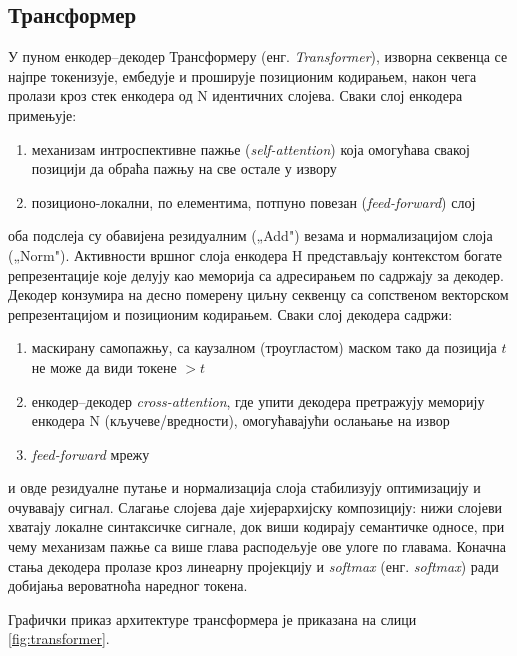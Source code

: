 \subsection{Трансформер}

У пуном енкодер--декодер Трансформеру (енг. \textit{Transformer}), изворна секвенца се најпре токенизује, ембедује и проширује позиционим кодирањем, након чега пролази кроз стек енкодера од N идентичних слојева. Сваки слој енкодера примењује:

\begin{enumerate}
\item механизам интроспективне пажње (\textit{self-attention}) која омогућава свакој позицији да обраћа пажњу на све остале у извору
\item позиционо-локални, по елементима, потпуно повезан (\textit{feed-forward}) слој
\end{enumerate}

оба подслеја су обавијена резидуалним („Add") везама и нормализацијом слоја („Norm"). Активности вршног слоја енкодера H представљају контекстом богате репрезентације које делују као меморија са адресирањем по садржају за декодер. Декодер конзумира на десно померену циљну секвенцу са сопственом векторском репрезентацијом и позиционим кодирањем. Сваки слој декодера садржи:

\begin{enumerate}
\item маскирану самопажњу, са каузалном (троугластом) маском тако да позиција $t$ не може да види токене $> t$
\item енкодер--декодер \textit{cross-attention}, где упити декодера претражују меморију енкодера N (кључеве/вредности), омогућавајући ослањање на извор
\item \textit{feed-forward} мрежу
\end{enumerate}

и овде резидуалне путање и нормализација слоја стабилизују оптимизацију и очувавају сигнал. Слагање слојева даје хијерархијску композицију: нижи слојеви хватају локалне синтаксичке сигнале, док виши кодирају семантичке односе, при чему механизам пажње са више глава расподељује ове улоге по главама. Коначна стања декодера пролазе кроз линеарну пројекцију и \textit{softmax} (енг. \textit{softmax}) ради добијања вероватноћа наредног токена.

Графички приказ архитектуре трансформера је приказана на слици \ref{fig:transformer}.

